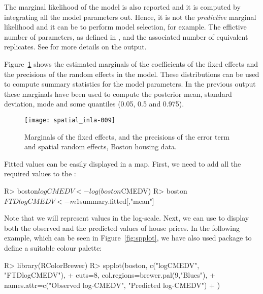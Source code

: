 \documentclass[article]{jss}
\begin{document}
The marginal likelihood of the model is also reported and it is computed by
integrating all the model parameters out. Hence, it is not the {\em
predictive} marginal likelihood and it can be to perform model selection, for
example.  The effictive number of parameters, as defined in
\citet{Spiegelhalteretal:2002}, and the associated number of equivalent
replicates. See \citet{isi:000284021400008} for more details on the
 output.

Figure~\ref{fig:marg1} shows the estimated marginals of the coefficients
of the fixed effects and the precisions of the
random effects in the model. These distributions can be used to compute summary
statistics for the model parameters. In the previous  output
these marginals have been used to compute the posterior mean, standard 
deviation, mode and some quantiles (0.05, 0.5 and 0.975).


\begin{figure}[h]
\begin{center}
\texttt{[image: spatial\_inla-009]}
\end{center}
\caption{Marginals of the fixed effects, and the precisions of the error term 
and spatial random effects, Boston housing data.}
\label{fig:marg1}
\end{figure}


Fitted values can be easily displayed in a map. First, we need to add
all the required values to the :

\begin{Schunk}
\begin{Sinput}
R> boston$logCMEDV<-log(boston$CMEDV)
R> boston$FTDlogCMEDV<-m1$summary.fitted[,"mean"]
\end{Sinput}
\end{Schunk}
\noindent
Note that we will represent values in the log-scale. 
Next, we can use  to display both the observed and the 
predicted  values of house prices. In the following example, which
can be seen in Figure~\ref{fig:spplot}, we have
also used package  to define a suitable colour palette:
\begin{Schunk}
\begin{Sinput}
R> library(RColorBrewer)
R> spplot(boston, c("logCMEDV", "FTDlogCMEDV"),
+     cuts=8, col.regions=brewer.pal(9,"Blues"),
+     names.attr=c("Observed log-CMEDV", "Predicted log-CMEDV")
+  )
\end{Sinput}
\end{Schunk}
\end{document}
